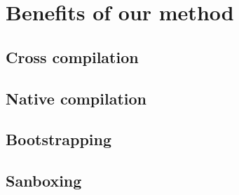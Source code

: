 \section{Benefits of our method}
 
\subsection{Cross compilation}

\subsection{Native compilation}

\subsection{Bootstrapping}

\subsection{Sanboxing}

